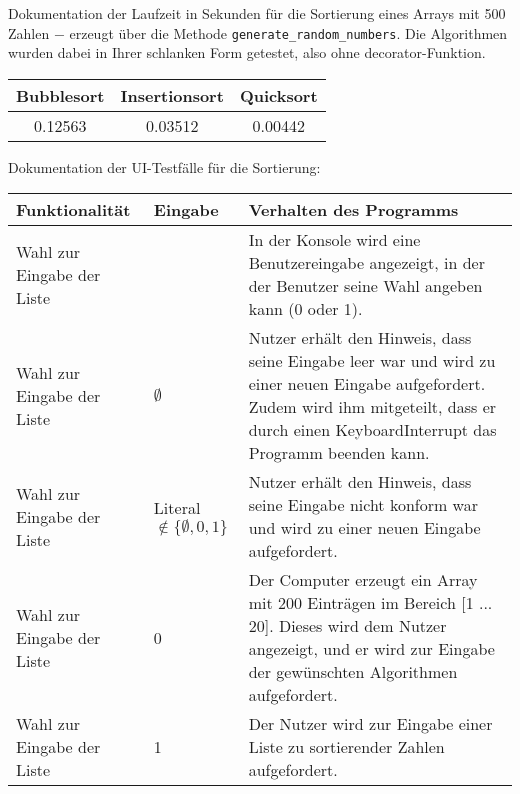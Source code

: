 \documentclass[a4paper]{article}
\begin{document}
\begin{exercise}{1}

Dokumentation der Laufzeit in Sekunden f\"ur die Sortierung eines Arrays mit 500 Zahlen $-$ erzeugt \"uber
die Methode \texttt{generate\_random\_numbers}. Die Algorithmen wurden dabei in Ihrer schlanken Form getestet, also ohne decorator-Funktion.

\begin{center}
	\begin{tabular}{| c | c | c |}
		\hline
		Bubblesort & Insertionsort & Quicksort\\ \hline \hline
		0.12563 & 0.03512 & 0.00442\\ \hline
	\end{tabular}
\end{center}


Dokumentation der UI-Testf\"alle f\"ur die Sortierung:

\begin{center}
	\begin{tabular}{| p{2.5cm} | p{2.2cm} | p{10cm} |}
		\hline
		Funktionalit\"at & Eingabe & Verhalten des Programms\\ \hline \hline
		
		Wahl zur Eingabe der Liste & 
		& In der Konsole wird eine Benutzereingabe angezeigt, in der der Benutzer seine Wahl
		angeben kann (0 oder 1). \\ \hline
		
		Wahl zur Eingabe der Liste & $\emptyset$
		& Nutzer erh\"alt den Hinweis, dass seine Eingabe leer war und wird zu einer neuen Eingabe
		aufgefordert. Zudem wird ihm mitgeteilt, dass er durch einen KeyboardInterrupt das Programm
		beenden kann. \\ \hline
		
		Wahl zur Eingabe der Liste & Literal $\notin \{\emptyset, 0, 1\}$
		& Nutzer erh\"alt den Hinweis, dass seine Eingabe nicht konform war und wird zu einer
		neuen Eingabe aufgefordert.\\ \hline
		
		Wahl zur Eingabe der Liste & 0
		& Der Computer erzeugt ein Array mit 200 Eintr\"agen im Bereich [1 ... 20]. Dieses wird dem
		Nutzer angezeigt, und er wird zur Eingabe der gew\"unschten Algorithmen aufgefordert.\\ \hline
		
		Wahl zur Eingabe der Liste & 1
		& Der Nutzer wird zur Eingabe einer Liste zu sortierender Zahlen aufgefordert.\\ \hline
		

\end{tabular}
\end{center}
\end{exercise}
\end{document}
